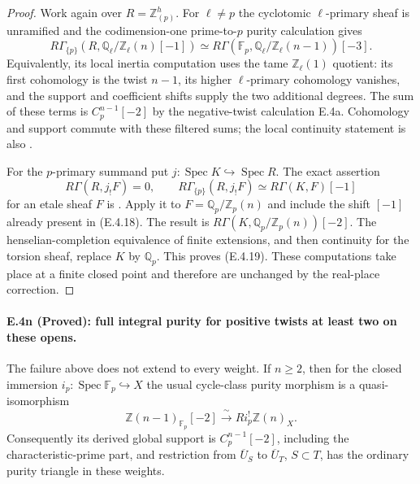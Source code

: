 \begin{proof}
Work again over $R=\mathbb Z_{(p)}^h$. For $\ell\ne p$ the
cyclotomic $\ell$-primary sheaf is unramified and the codimension-one
prime-to-$p$ purity calculation gives
\[
 R\Gamma_{\{p\}}(R,\mathbb Q_\ell/\mathbb Z_\ell(n)[-1])
  \simeq
 R\Gamma(\mathbb F_p,\mathbb Q_\ell/\mathbb Z_\ell(n-1))[-3].
\]
Equivalently, its local inertia computation uses the tame
$\mathbb Z_\ell(1)$ quotient: its first cohomology is the twist
$n-1$, its higher $\ell$-primary cohomology vanishes, and the
support and coefficient shifts supply the two additional degrees.
The sum of these terms is $C_p^{n-1}[-2]$ by the
negative-twist calculation E.4a. Cohomology and support commute
with these filtered sums; the local continuity statement is also
\citet[Lemma 2.1]{D_GeisserDedekind2004}.

For the $p$-primary summand put
$j:\operatorname{Spec}K\hookrightarrow\operatorname{Spec}R$.
The exact assertion
\[
 R\Gamma(R,j_!F)=0,\qquad
 R\Gamma_{\{p\}}(R,j_!F)\simeq R\Gamma(K,F)[-1]
\]
for an etale sheaf $F$ is
\citet[II, Proposition 1.1(a)]{D_MilneADT2006}.
Apply it to $F=\mathbb Q_p/\mathbb Z_p(n)$ and include the
shift $[-1]$ already present in (E.4.18). The result is
$R\Gamma(K,\mathbb Q_p/\mathbb Z_p(n))[-2]$.
The henselian-completion equivalence of finite extensions,
and then continuity for the torsion sheaf, replace $K$ by
$\mathbb Q_p$. This proves (E.4.19).
These computations take place at a finite closed point and
therefore are unchanged by the real-place correction.
\end{proof}

\paragraph{E.4n (Proved): full integral purity for positive twists at least two on these opens.}
The failure above does not extend to every weight. If $n\ge2$,
then for the closed immersion $i_p:\operatorname{Spec}\mathbb F_p
\hookrightarrow X$ the usual cycle-class purity morphism is a
quasi-isomorphism
\[
 \mathbb Z(n-1)_{\mathbb F_p}[-2]
       \xrightarrow{\ \sim\ } Ri_p^!\mathbb Z(n)_X.
 \tag{E.4.20}
\]
Consequently its derived global support is $C_p^{n-1}[-2]$,
including the characteristic-prime part, and restriction from
$\overline U_S$ to $\overline U_T$, $S\subset T$, has the
ordinary purity triangle in these weights.

